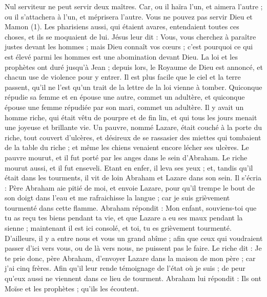 \begin{multicols}{2}
Nul serviteur ne peut servir deux maîtres. Car, ou il haïra l'un, et aimera l'autre ; ou il s'attachera à l'un, et méprisera l'autre. Vous ne pouvez pas servir Dieu et Mamon (1).
Les pharisiens aussi, qui étaient avares, entendaient toutes ces choses, et ils se moquaient de lui.
Jésus leur dit : Vous, vous cherchez à paraître justes devant les hommes ; mais Dieu connaît vos cœurs ; c'est pourquoi ce qui est élevé parmi les hommes est une abomination devant Dieu.
La loi et les prophètes ont duré jusqu'à Jean ; depuis lors, le Royaume de Dieu est annoncé, et chacun use de violence pour y entrer.
Il est plus facile que le ciel et la terre passent, qu’il ne l’est qu’un trait de la lettre de la loi vienne à tomber.
Quiconque répudie sa femme et en épouse une autre, commet un adultère, et quiconque épouse une femme répudiée par son mari, commet un adultère.
Il y avait un homme riche, qui était vêtu de pourpre et de fin lin, et qui tous les jours menait une joyeuse et brillante vie.
Un pauvre, nommé Lazare, était couché à la porte du riche, tout couvert d'ulcères,
et désireux de se rassasier des miettes qui tombaient de la table du riche ; et même les chiens venaient encore lécher ses ulcères.
Le pauvre mourut, et il fut porté par les anges dans le sein d'Abraham. Le riche mourut aussi, et il fut enseveli.
Etant en enfer, il leva ses yeux ; et, tandis qu’il était dans les tourments, il vit de loin Abraham et Lazare dans son sein.
Il s’écria : Père Abraham aie pitié de moi, et envoie Lazare, pour qu’il trempe le bout de son doigt dans l’eau et me rafraichisse la langue ; car je suis grièvement tourmenté dans cette flamme.
Abraham répondit : Mon enfant, souviens-toi que tu as reçu tes biens pendant ta vie, et que Lazare a eu ses maux pendant la sienne ; maintenant il est ici consolé, et toi, tu es grièvement tourmenté.
D’ailleurs, il y a entre nous et vous un grand abîme ; afin que ceux qui voudraient passer d'ici vers vous, ou de là vers nous, ne puissent pas le faire.
Le riche dit : Je te prie donc, père Abraham, d’envoyer Lazare dans la maison de mon père ; car j’ai cinq frères.
Afin qu'il leur rende témoignage de l'état où je suis ; de peur qu'eux aussi ne viennent dans ce lieu de tourment.
Abraham lui répondit : Ils ont Moïse et les prophètes ; qu'ils les écoutent.

\end{multicols}
